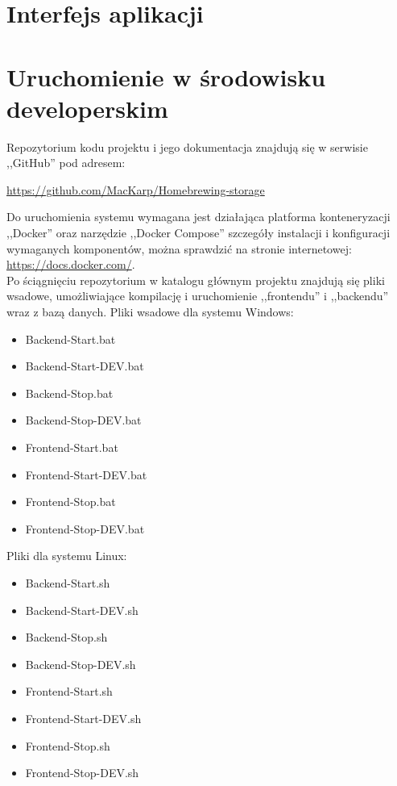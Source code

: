 \documentclass[12pt,a4paper]{article}
\begin{document}
	\section{Interfejs aplikacji}
	\newpage
	
	\section{Uruchomienie w środowisku developerskim}
		\indent Repozytorium kodu projektu i jego dokumentacja znajdują się w serwisie ,,GitHub'' pod adresem: 
			\begin{tcolorbox}[minipage,colback=white,arc=0pt,outer arc=0pt, fontupper=\scriptsize]
				\center
				\url{https://github.com/MacKarp/Homebrewing-storage}
			\end{tcolorbox}
		\indent Do uruchomienia systemu wymagana jest działająca platforma konteneryzacji ,,Docker''
			oraz narzędzie ,,Docker Compose'' szczegóły instalacji i konfiguracji wymaganych
			komponentów, można sprawdzić na stronie internetowej: \url{https://docs.docker.com/}.\\
		\indent Po ściągnięciu repozytorium w katalogu głównym projektu znajdują się pliki wsadowe, umożliwiające kompilację i uruchomienie ,,frontendu'' i ,,backendu''
		wraz z bazą danych.
		Pliki wsadowe dla systemu Windows:
		\begin{itemize}
			\item Backend-Start.bat
			\item Backend-Start-DEV.bat
			\item Backend-Stop.bat
			\item Backend-Stop-DEV.bat
			\item Frontend-Start.bat
			\item Frontend-Start-DEV.bat
			\item Frontend-Stop.bat
			\item Frontend-Stop-DEV.bat
		\end{itemize}
		Pliki dla systemu Linux:
		\begin{itemize}
			\item Backend-Start.sh
			\item Backend-Start-DEV.sh
			\item Backend-Stop.sh
			\item Backend-Stop-DEV.sh
			\item Frontend-Start.sh
			\item Frontend-Start-DEV.sh
			\item Frontend-Stop.sh
			\item Frontend-Stop-DEV.sh
		\end{itemize}
\end{document}
